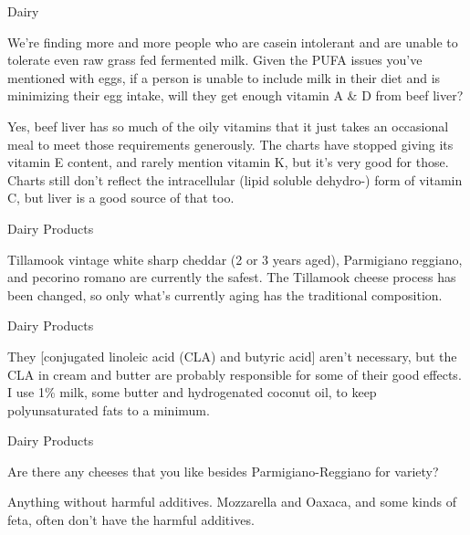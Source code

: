 \documentclass[11pt,oneside,openany,extrafontsizes]{memoir}
\begin{document}
\begin{qaexchange}{Dairy}

    \begin{question}
        We're finding more and more people who are casein
intolerant and are unable to tolerate even raw grass fed fermented
milk. Given the PUFA issues you've mentioned with eggs, if a person
is unable to include milk in their diet and is minimizing their egg
intake, will they get enough vitamin A \& D from beef liver?
    \end{question}

    \begin{answer}
        Yes, beef liver has so much of the oily vitamins that it
just takes an occasional meal to meet those requirements generously.
The charts have stopped giving its vitamin E content, and rarely
mention vitamin K, but it's very good for those. Charts still don't
reflect the intracellular (lipid soluble dehydro-) form of vitamin
C, but liver is a good source of that too.
    \end{answer}
\end{qaexchange}

\begin{standalonequote}{Dairy Products}

    \begin{answer}
      Tillamook vintage white sharp cheddar (2 or 3 years aged), Parmigiano reggiano, and pecorino romano are currently the safest. The Tillamook cheese process has been changed, so only what's currently aging has the traditional composition.
    \end{answer}
\end{standalonequote}

\begin{standalonequote}{Dairy Products}

    \begin{answer}
      They [conjugated linoleic acid (CLA) and butyric acid] aren't necessary, but the CLA in cream and butter are probably responsible for some of their good effects. I use 1\% milk, some butter and hydrogenated coconut oil, to keep polyunsaturated fats to a minimum.
    \end{answer}
\end{standalonequote}

\begin{qaexchange}{Dairy Products}

    \begin{question}
        Are there any cheeses that you like besides Parmigiano-Reggiano for variety?
    \end{question}

    \begin{answer}
      Anything without harmful additives. Mozzarella and Oaxaca, and some kinds of feta, often don't have the harmful additives.
    \end{answer}
\end{qaexchange}
\end{document}
